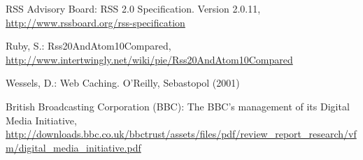 \documentclass[runningheads,a4paper]{llncs}
\begin{document}
\begin{thebibliography}{}
 RSS Advisory Board: RSS 2.0 Specification. Version 2.0.11,\\
\url{http://www.rssboard.org/rss-specification}

 Ruby, S.: Rss20AndAtom10Compared,\\
\url{http://www.intertwingly.net/wiki/pie/Rss20AndAtom10Compared}

 Wessels, D.: Web Caching. O'Reilly, Sebastopol (2001)

 British Broadcasting Corporation (BBC): The BBC's management of its Digital Media Initiative,\\
\url{http://downloads.bbc.co.uk/bbctrust/assets/files/pdf/review_report_research/vfm/digital_media_initiative.pdf}

\end{thebibliography}
\end{document}
